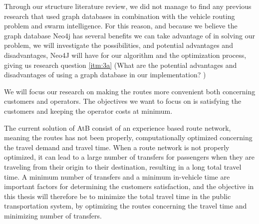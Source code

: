 Through our structure literature review, we did not manage to find any previous research that used graph databases in combination with the vehicle routing problem and swarm intelligence. For this reason, and because we believe the graph database Neo4j \citep{website:neo4j} has several benefits we can take advantage of in solving our problem, we will investigate the possibilities, and potential advantages and disadvantages, Neo4J will have for our algorithm and the optimization process, giving us research question \vref{itm:3a} (What are the potential advantages and disadvantages of using a graph database in our implementation? )

We will focus our research on making the routes more convenient both concerning customers and operators. The objectives we want to focus on is satisfying the customers and keeping the operator costs at minimum. 

The current solution of AtB \citep{website:atb} consist of an experience based route network, meaning the routes has not been properly, computationally optimized concerning the travel demand and travel time. When a route network is not properly optimized, it can lead to a large number of transfers for passengers when they are traveling from their origin to their destination, resulting in a long total travel time. A minimum number of transfers and a minimum in-vehicle time are important factors for determining the customers satisfaction, and the objective in this thesis will therefore be to minimize the total travel time in the public transportation system, by optimizing the routes concerning the travel time and minimizing number of transfers. %

